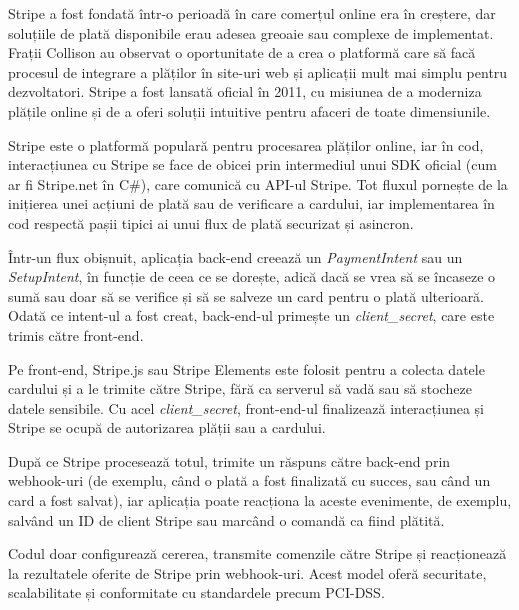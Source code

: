 Stripe a fost fondată într-o perioadă în care comerțul online era în creștere, dar soluțiile de
plată disponibile erau adesea greoaie sau complexe de implementat. Frații Collison au observat o
oportunitate de a crea o platformă care să facă procesul de integrare a plăților în site-uri web și
aplicații mult mai simplu pentru dezvoltatori. Stripe a fost lansată oficial în 2011, cu misiunea de
a moderniza plățile online și de a oferi soluții intuitive pentru afaceri de toate dimensiunile. \parencite{stripe}

Stripe este o platformă populară pentru procesarea plăților online, iar în cod, interacțiunea cu Stripe se face de obicei prin intermediul unui SDK oficial (cum ar fi Stripe.net în C\#), care comunică cu API-ul Stripe. Tot fluxul pornește de la inițierea unei acțiuni de plată sau de verificare a cardului, iar implementarea în cod respectă pașii tipici ai unui flux de plată securizat și asincron. \parencite{stripe}

Într-un flux obișnuit, aplicația back-end creează un \textit{PaymentIntent} sau un \textit{SetupIntent}, în funcție de ceea ce se dorește, adică dacă se vrea să se încaseze o sumă sau doar să se verifice și să se salveze un card pentru o plată ulterioară. Odată ce intent-ul a fost creat, back-end-ul primește un \textit{client\_secret}, care este trimis către front-end. \parencite{stripe}

Pe front-end, Stripe.js sau Stripe Elements este folosit pentru a colecta datele cardului și a le trimite către Stripe, fără ca serverul să vadă sau să stocheze datele sensibile. Cu acel \textit{client\_secret}, front-end-ul finalizează interacțiunea și Stripe se ocupă de autorizarea plății sau a cardului. \parencite{stripe}

După ce Stripe procesează totul, trimite un răspuns către back-end prin webhook-uri (de exemplu, când o plată a fost finalizată cu succes, sau când un card a fost salvat), iar aplicația poate reacționa la aceste evenimente, de exemplu, salvând un ID de client Stripe sau marcând o comandă ca fiind plătită. \parencite{stripe}

Codul doar configurează cererea, transmite comenzile către Stripe și reacționează la rezultatele oferite de Stripe prin webhook-uri. Acest model oferă securitate, scalabilitate și conformitate cu standardele precum PCI-DSS.